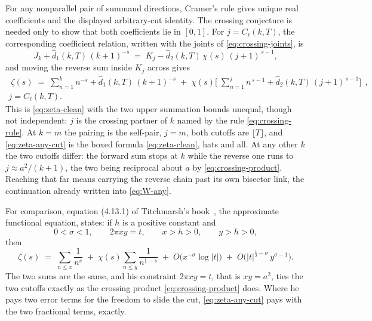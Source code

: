 \documentclass[11pt]{article}
\theoremstyle{definition}
\begin{document}
For any nonparallel pair of summand directions, Cramer's rule gives unique
real coefficients and the displayed arbitrary-cut identity. The crossing
conjecture is needed only to show that both coefficients lie in $[0,1]$.
For $j=C_{\ell}(k,T)$, the corresponding coefficient relation, written with
the joints of \eqref{eq:crossing-joints}, is
\begin{equation}\label{eq:cut-two-ways}
J_k+\hat d_1(k,T)\,(k+1)^{-s}
\;=\;
K_j-\hat d_2(k,T)\,\chi(s)\,(j+1)^{\,s-1},
\end{equation}
and moving the reverse sum inside $K_j$ across gives
\begin{equation}\label{eq:zeta-any-cut}
\begin{gathered}
\boxed{\;
\zeta(s)
\;=\;
\sum_{n=1}^{k}n^{-s}+\hat d_1(k,T)\,(k+1)^{-s}
\;+\;\chi(s)\Biggl[\;\sum_{n=1}^{j}n^{\,s-1}+\hat d_2(k,T)\,(j+1)^{\,s-1}\Biggr]
\;}\,,\\[4pt]
j=C_{\ell}(k,T).
\end{gathered}
\end{equation}
This is \eqref{eq:zeta-clean} with the two upper summation bounds unequal,
though not independent: $j$ is the crossing partner of $k$ named by the rule
\eqref{eq:crossing-rule}. At $k=m$ the
pairing is the self-pair, $j=m$, both cutoffs are $\lfloor T\rfloor$, and
\eqref{eq:zeta-any-cut} is the boxed formula \eqref{eq:zeta-clean}, hats and all. At any other $k$
the two cutoffs differ: the forward sum stops at $k$ while the reverse one
runs to $j\approx a^{2}/(k+1)$, the two being reciprocal about $a$ by
\eqref{eq:crossing-product}. Reaching that far means carrying the reverse
chain past its own bisector link, the continuation already written into
\eqref{eq:W-any}.

For comparison, equation (4.13.1) of Titchmarsh's
book~\cite[\S4.13]{Titchmarsh1986}, the approximate functional equation,
states: if $h$ is a positive constant and
\[
0<\sigma<1,\qquad 2\pi xy=t,\qquad x>h>0,\qquad y>h>0,
\]
then
\begin{equation}\label{eq:titchmarsh-afe}
\zeta(s)\;=\;\sum_{n\le x}\frac{1}{n^{s}}
\;+\;\chi(s)\sum_{n\le y}\frac{1}{n^{1-s}}
\;+\;O\bigl(x^{-\sigma}\log|t|\bigr)
\;+\;O\bigl(|t|^{\frac12-\sigma}\,y^{\sigma-1}\bigr).
\end{equation}
The two sums are the same, and his constraint $2\pi xy=t$, that is
$xy=a^{2}$, ties the two cutoffs exactly as the crossing product
\eqref{eq:crossing-product} does. Where he pays two error terms for the
freedom to slide the cut, \eqref{eq:zeta-any-cut} pays with the two
fractional terms, exactly.
\end{document}

